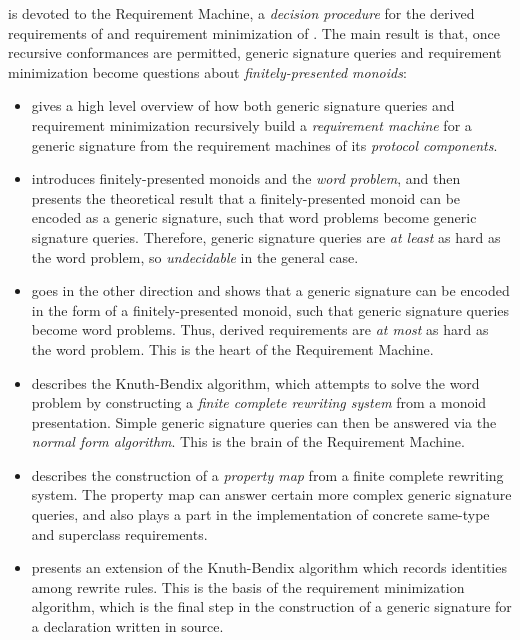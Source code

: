 \documentclass[../generics]{subfiles}
\begin{document}
 is devoted to the Requirement Machine, a \emph{decision procedure} for the derived requirements of  and requirement minimization of . The main result is that, once recursive conformances are permitted, generic signature queries and requirement minimization become questions about \emph{finitely-presented monoids}:
\begin{itemize}
\item {} gives a high level overview of how both generic signature queries and requirement minimization recursively build a \emph{requirement machine} for a generic signature from the requirement machines of its \emph{protocol components}.

\item {} introduces finitely-presented monoids and the \emph{word problem}, and then presents the theoretical result that a finitely-presented monoid can be encoded as a generic signature, such that word problems become generic signature queries. Therefore, generic signature queries are \emph{at least} as hard as the word problem, so \emph{undecidable} in the general case.

\item {} goes in the other direction and shows that a generic signature can be encoded in the form of a finitely-presented monoid, such that generic signature queries become word problems. Thus, derived requirements are \emph{at most} as hard as the word problem. This is the heart of the Requirement Machine.

\item {} describes the Knuth-Bendix algorithm, which attempts to solve the word problem by constructing a \emph{finite complete rewriting system} from a monoid presentation. Simple generic signature queries can then be answered via the \emph{normal form algorithm}. This is the brain of the Requirement Machine.

\item {} describes the construction of a \emph{property map} from a finite complete rewriting system. The property map can answer certain more complex generic signature queries, and also plays a part in the implementation of concrete same-type and superclass requirements.

\ifWIP

\item {} presents an extension of the Knuth-Bendix algorithm which records identities among rewrite rules. This is the basis of the requirement minimization algorithm, which is the final step in the construction of a generic signature for a declaration written in source.

\fi

\end{itemize}
\end{document}
